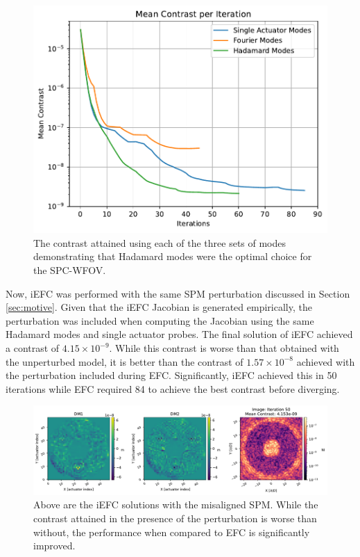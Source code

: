 \documentclass[12pt]{spieman}  %
\begin{document}
\begin{spacing}{2}
\begin{figure}[h]
    \centering
    \includegraphics[scale=0.8]{figs-spc-825/contrast_per_iteration.pdf}
    \caption{The contrast attained using each of the three sets of modes demonstrating that Hadamard modes were the optimal choice for the SPC-WFOV.}
    \label{fig:convergence}
\end{figure}

Now, iEFC was performed with the same SPM perturbation discussed in Section \ref{sec:motive}. Given that the iEFC Jacobian is generated empirically, the perturbation was included when computing the Jacobian using the same Hadamard modes and single actuator probes. The final solution of iEFC achieved a contrast of $4.15\times10^{-9}$. While this contrast is worse than that obtained with the unperturbed model, it is better than the contrast of $1.57\times10^{-8}$ achieved with the perturbation included during EFC. Significantly, iEFC achieved this in 50 iterations while EFC required 84 to achieve the best contrast before diverging. 

\begin{figure}[h]
    \centering
    \includegraphics[scale=0.5]{figs-spc-825/iefc_perturbed_best_image.pdf}
    \caption{Above are the iEFC solutions with the misaligned SPM. While the contrast attained in the presence of the perturbation is worse than without, the performance when compared to EFC is significantly improved.}
    \label{fig:iefc-perturbed}
\end{figure}


\end{spacing}
\end{document}
